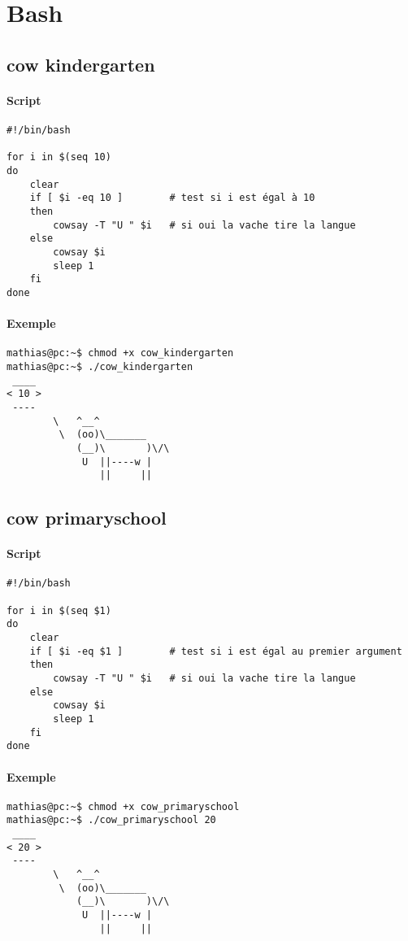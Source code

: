 \documentclass[french, 10pt, a4paper]{article}
\begin{document}
\section{Bash}

\subsection{cow kindergarten}

\paragraph{Script}
\begin{verbatim}
#!/bin/bash

for i in $(seq 10)
do
	clear
	if [ $i -eq 10 ]		# test si i est égal à 10
	then
		cowsay -T "U " $i	# si oui la vache tire la langue
	else
		cowsay $i
		sleep 1
	fi
done
\end{verbatim}

\paragraph{Exemple}
\begin{verbatim}
mathias@pc:~$ chmod +x cow_kindergarten
mathias@pc:~$ ./cow_kindergarten
 ____
< 10 >
 ----
        \   ^__^
		 \  (oo)\_______
			(__)\       )\/\
			 U  ||----w |
				||     ||
\end{verbatim}



\subsection{cow primaryschool}

\paragraph{Script}
\begin{verbatim}
#!/bin/bash

for i in $(seq $1)
do
	clear
	if [ $i -eq $1 ]        # test si i est égal au premier argument
	then
		cowsay -T "U " $i   # si oui la vache tire la langue
	else
		cowsay $i
		sleep 1
	fi
done
\end{verbatim}

\paragraph{Exemple}
\begin{verbatim}
mathias@pc:~$ chmod +x cow_primaryschool
mathias@pc:~$ ./cow_primaryschool 20
 ____
< 20 >
 ----
		\   ^__^
		 \  (oo)\_______
			(__)\       )\/\
			 U  ||----w |
				||     ||
\end{verbatim}
\end{document}
